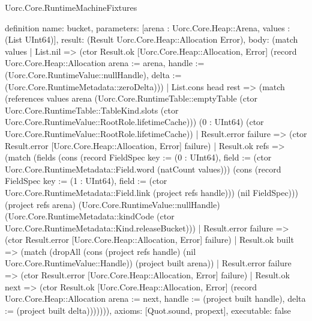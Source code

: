 \begin{lexlean}{Uorc.Core.RuntimeMachineFixtures}
\begin{semanticmodule}
definition{
  name: bucket,
  parameters: [arena : Uorc.Core.Heap::Arena, values : (List UInt64)],
  result: (Result Uorc.Core.Heap::Allocation Error),
  body: (match values
    | List.nil => (ctor Result.ok [Uorc.Core.Heap::Allocation, Error] (record Uorc.Core.Heap::Allocation {arena := arena, handle := (Uorc.Core.RuntimeValue::nullHandle), delta := (Uorc.Core.RuntimeMetadata::zeroDelta)}))
    | List.cons head rest => (match (references values arena (Uorc.Core.RuntimeTable::emptyTable (ctor Uorc.Core.RuntimeTable::TableKind.slots (ctor Uorc.Core.RuntimeValue::RootRole.lifetimeCache))) (0 : UInt64) (ctor Uorc.Core.RuntimeValue::RootRole.lifetimeCache))
      | Result.error failure => (ctor Result.error [Uorc.Core.Heap::Allocation, Error] failure)
      | Result.ok refs => (match (fields (cons (record FieldSpec {key := (0 : UInt64), field := (ctor Uorc.Core.RuntimeMetadata::Field.word (natCount values))}) (cons (record FieldSpec {key := (1 : UInt64), field := (ctor Uorc.Core.RuntimeMetadata::Field.link (project refs handle))}) (nil FieldSpec))) (project refs arena) (Uorc.Core.RuntimeValue::nullHandle) (Uorc.Core.RuntimeMetadata::kindCode (ctor Uorc.Core.RuntimeMetadata::Kind.releaseBucket)))
        | Result.error failure => (ctor Result.error [Uorc.Core.Heap::Allocation, Error] failure)
        | Result.ok built => (match (dropAll (cons (project refs handle) (nil Uorc.Core.RuntimeValue::Handle)) (project built arena))
          | Result.error failure => (ctor Result.error [Uorc.Core.Heap::Allocation, Error] failure)
          | Result.ok next => (ctor Result.ok [Uorc.Core.Heap::Allocation, Error] (record Uorc.Core.Heap::Allocation {arena := next, handle := (project built handle), delta := (project built delta)})))))),
  axioms: [Quot.sound, propext],
  executable: false
}


\end{semanticmodule}
\end{lexlean}
